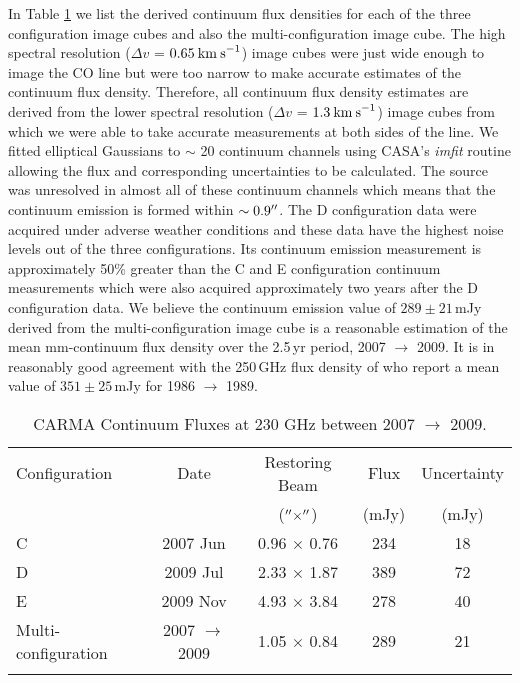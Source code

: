 In Table \ref{tab:5.1} we list the derived continuum flux densities for each of the three configuration image cubes and also the multi-configuration image cube. The high spectral resolution ($\Delta v$ = $0.65\>{\rm km\>s}^{-1}$) image cubes were just wide enough to image the CO line but were too narrow to make accurate estimates of the continuum flux density. Therefore, all continuum flux density estimates are derived from the lower spectral resolution ($\Delta v$ = $1.3\>{\rm km\>s}^{-1}$) image cubes from which we were able to take accurate measurements at both sides of the line. We fitted elliptical Gaussians to $\sim$ 20 continuum channels using CASA's \textit{imfit} routine allowing the flux and corresponding uncertainties to be calculated. The source was unresolved in almost all of these continuum channels which means that the continuum emission is formed within $\sim 0.9^{\prime\prime}$. The D configuration data were acquired under adverse weather conditions and these data have the highest noise levels out of the three configurations. Its continuum emission measurement is approximately 50\% greater than the C and E configuration continuum measurements which were also acquired approximately two years after the D configuration data.  We believe the continuum emission value of $289 \pm 21$\,mJy derived from the multi-configuration image cube is a reasonable estimation of the mean mm-continuum flux density over the 2.5\,yr period, 2007 $\rightarrow$ 2009. It is in reasonably good agreement with the 250\,GHz flux density of \cite{altenhoff_1994} who report a mean value of $351 \pm 25$\,mJy for 1986 $\rightarrow$ 1989.

\begin{table}[!t]
\begin{center}
\caption[CARMA Continuum Fluxes at 230 GHz]
{CARMA Continuum Fluxes at 230 GHz between 2007 $\rightarrow$ 2009.}
\begin{tabular}{lcccc}
\hline
\hline
\rule{0pt}{2.5ex}Configuration & Date &Restoring Beam & Flux & Uncertainty \\
 &  & ($^{\prime\prime} \times ^{\prime\prime}$) &(mJy) & (mJy) \\
\hline
\rule{0pt}{2.5ex}C & 2007 Jun&0.96 $\times$ 0.76 & 234 & 18\\
D & 2009 Jul&2.33 $\times$ 1.87 & 389 & 72\\
E & 2009 Nov&4.93 $\times$ 3.84 & 278 & 40 \\
Multi-configuration &2007 $\rightarrow$ 2009 &1.05 $\times$ 0.84 & 289 & 21\\
\hline
\rule{0pt}{2.0ex}
\end{tabular}
\label{tab:5.1}
\end{center}
\vspace{-1.0cm}
\end{table}


